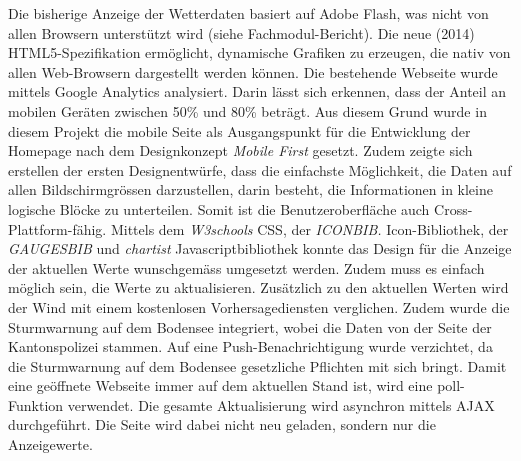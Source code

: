 \documentclass[10pt]{article}
\begin{document}
\begin{multicols}{2}
Die bisherige Anzeige der Wetterdaten basiert auf Adobe Flash, was nicht von allen Browsern unterstützt wird (siehe Fachmodul-Bericht). Die neue (2014) HTML5-Spezifikation ermöglicht, dynamische Grafiken zu erzeugen, die nativ von allen Web-Browsern dargestellt werden können. Die bestehende Webseite wurde mittels Google Analytics analysiert. Darin lässt sich erkennen, dass der Anteil an mobilen Geräten zwischen 50\% und 80\% beträgt. Aus diesem Grund wurde in diesem Projekt die mobile Seite als Ausgangspunkt für die Entwicklung der Homepage nach dem Designkonzept \textit{Mobile First} gesetzt. Zudem zeigte sich erstellen der ersten Designentwürfe, dass die einfachste Möglichkeit, die Daten auf allen Bildschirmgrössen darzustellen, darin besteht, die Informationen in kleine logische Blöcke zu unterteilen. Somit ist die Benutzeroberfläche auch Cross-Plattform-fähig. Mittels dem \textit{W3schools} CSS, der \textit{ICONBIB.} Icon-Bibliothek, der \textit{GAUGESBIB} und \textit{chartist} Javascriptbibliothek konnte das Design für die Anzeige der aktuellen Werte wunschgemäss umgesetzt werden. Zudem muss es einfach möglich sein, die Werte zu aktualisieren.  %
Zusätzlich zu den aktuellen Werten wird der Wind mit einem kostenlosen Vorhersagediensten verglichen. Zudem wurde die Sturmwarnung auf dem Bodensee integriert, wobei die Daten von der Seite der Kantonspolizei stammen. Auf eine Push-Benachrichtigung wurde verzichtet, da die Sturmwarnung auf dem Bodensee gesetzliche Pflichten mit sich bringt. Damit eine geöffnete Webseite immer auf dem aktuellen Stand ist, wird eine poll-Funktion verwendet. Die gesamte Aktualisierung wird asynchron mittels AJAX durchgeführt. Die Seite wird dabei nicht neu geladen,  sondern nur die Anzeigewerte.\\


\end{multicols}
\end{document}
